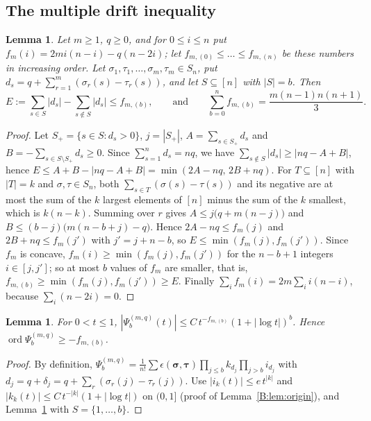 \documentclass[11pt,a4paper]{article}
\newtheorem{lemma}[theorem]{Lemma}
\theoremstyle{definition}
\theoremstyle{remark}
\DeclareMathOperator{\ord}{ord}
\numberwithin{equation}{section}
\begin{document}
\subsection{The multiple drift inequality}

\begin{lemma}\label{V:lem:mdrift}
Let $m\ge1$, $q\ge0$, and for $0\le i\le n$ put $f_m(i)=2mi(n-i)-q(n-2i)$; let $f_{m,(0)}\le\dots\le f_{m,(n)}$ be these numbers in increasing order. Let $\sigma_1,\tau_1,\dots,\sigma_m,\tau_m\in S_n$, put $d_s=q+\sum_{r=1}^m(\sigma_r(s)-\tau_r(s))$, and let $S\subseteq[n]$ with $|S|=b$. Then
\[
E:=\sum_{s\in S}|d_s|-\sum_{s\notin S}|d_s|\le f_{m,(b)},\qquad\text{and}\qquad\sum_{b=0}^nf_{m,(b)}=\frac{m(n-1)n(n+1)}3 .
\]
\end{lemma}

\begin{proof}
Let $S_+=\{s\in S:d_s>0\}$, $j=|S_+|$, $A=\sum_{s\in S_+}d_s$ and $B=-\sum_{s\in S\setminus S_+}d_s\ge0$. Since $\sum_{s=1}^nd_s=nq$, we have $\sum_{s\notin S}|d_s|\ge|nq-A+B|$, hence $E\le A+B-|nq-A+B|=\min(2A-nq,\,2B+nq)$. For $T\subseteq[n]$ with $|T|=k$ and $\sigma,\tau\in S_n$, both $\sum_{s\in T}(\sigma(s)-\tau(s))$ and its negative are at most the sum of the $k$ largest elements of $[n]$ minus the sum of the $k$ smallest, which is $k(n-k)$. Summing over $r$ gives $A\le j\bigl(q+m(n-j)\bigr)$ and $B\le(b-j)\bigl(m(n-b+j)-q\bigr)$. Hence $2A-nq\le f_m(j)$ and $2B+nq\le f_m(j')$ with $j'=j+n-b$, so $E\le\min(f_m(j),f_m(j'))$. Since $f_m$ is concave, $f_m(i)\ge\min(f_m(j),f_m(j'))$ for the $n-b+1$ integers $i\in[j,j']$; so at most $b$ values of $f_m$ are smaller, that is, $f_{m,(b)}\ge\min(f_m(j),f_m(j'))\ge E$. Finally $\sum_if_m(i)=2m\sum_ii(n-i)$, because $\sum_i(n-2i)=0$.
\end{proof}

\begin{lemma}\label{V:lem:even-origin}
For $0<t\le1$, $|\Psi^{(m,q)}_b(t)|\le C\,t^{-f_{m,(b)}}(1+|\log t|)^b$. Hence $\ord\Psi^{(m,q)}_b\ge-f_{m,(b)}$.
\end{lemma}

\begin{proof}
By definition, $\Psi^{(m,q)}_b=\frac1{n!}\sum\epsilon(\boldsymbol\sigma,\boldsymbol\tau)\prod_{j\le b}k_{d_j}\prod_{j>b}i_{d_j}$ with $d_j=q+\delta_j=q+\sum_r(\sigma_r(j)-\tau_r(j))$. Use $|i_k(t)|\le e\,t^{|k|}$ and $|k_k(t)|\le C\,t^{-|k|}(1+|\log t|)$ on $(0,1]$ (proof of Lemma~\ref{B:lem:origin}), and Lemma~\ref{V:lem:mdrift} with $S=\{1,\dots,b\}$.
\end{proof}
\end{document}
